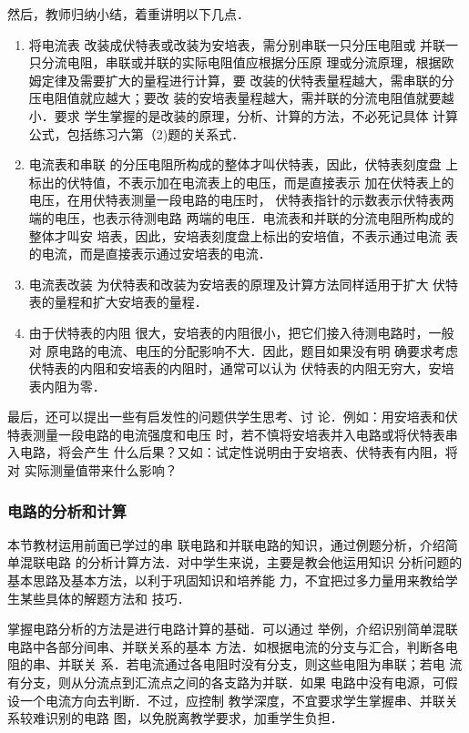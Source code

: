 然后，教师归纳小结，着重讲明以下几点．
\begin{enumerate}
\item 将电流表
改装成伏特表或改装为安培表，需分别串联一只分压电阻或
并联一只分流电阻，串联或并联的实际电阻值应根据分压原
理或分流原理，根据欧姆定律及需要扩大的量程进行计算，要
改装的伏特表量程越大，需串联的分压电阻值就应越大；要改
装的安培表量程越大，需并联的分流电阻值就要越小．要求
学生掌握的是改装的原理，分析、计算的方法，不必死记具体
计算公式，包括练习六第（2)题的关系式．
\item 电流表和串联
的分压电阻所构成的整体才叫伏特表，因此，伏特表刻度盘
上标出的伏特值，不表示加在电流表上的电压，而是直接表示
加在伏特表上的电压，在用伏特表测量一段电路的电压时，
伏特表指针的示数表示伏特表两端的电压，也表示待测电路
两端的电压．电流表和并联的分流电阻所构成的整体才叫安
培表，因此，安培表刻度盘上标出的安培值，不表示通过电流
表的电流，而是直接表示通过安培表的电流．
\item 电流表改装
为伏特表和改装为安培表的原理及计算方法同样适用于扩大
伏特表的量程和扩大安培表的量程．
\item 由于伏特表的内阻
很大，安培表的内阻很小，把它们接入待测电路时，一般对
原电路的电流、电压的分配影响不大．因此，题目如果没有明
确要求考虑伏特表的内阻和安培表的内阻时，通常可以认为
伏特表的内阻无穷大，安培表内阻为零．
\end{enumerate}

最后，还可以提出一些有启发性的问题供学生思考、讨
论．例如：用安培表和伏特表测量一段电路的电流强度和电压
时，若不慎将安培表并入电路或将伏特表串入电路，将会产生
什么后果？又如：试定性说明由于安培表、伏特表有内阻，将对
实际测量值带来什么影响？

\subsubsection{电路的分析和计算}

本节教材运用前面已学过的串
联电路和并联电路的知识，通过例题分析，介绍简单混联电路
的分析计算方法．对中学生来说，主要是教会他运用知识
分析问题的基本思路及基本方法，以利于巩固知识和培养能
力，不宜把过多力量用来教给学生某些具体的解题方法和
技巧．

掌握电路分析的方法是进行电路计算的基础．可以通过
举例，介绍识别简单混联电路中各部分间串、并联关系的基本
方法．如根据电流的分支与汇合，判断各电阻的串、并联关
系．若电流通过各电阻时没有分支，则这些电阻为串联；若电
流有分支，则从分流点到汇流点之间的各支路为并联．如果
电路中没有电源，可假设一个电流方向去判断．不过，应控制
教学深度，不宜要求学生掌握串、并联关系较难识别的电路
图，以免脱离教学要求，加重学生负担．

